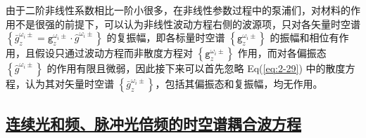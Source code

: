 由于二阶非线性系数相比一阶小很多，在非线性参数过程中的泵浦们，对材料的作用不是很强的前提下，可以认为非线性波动方程右侧的波源项，只对各矢量时空谱 $\left\{ \bar{g}^{\omega_i\pm}_{z} = {\mathtt{g}}^{\omega_i\pm}_{z} \cdot \hat{g}^{\omega_i\pm} \right\}$ 的复振幅，即各标量时空谱 $\left\{ {\mathtt{g}}^{\omega_i\pm}_{z} \right\}$ 的振幅和相位有作用，且假设只通过波动方程而非散度方程对 $\left\{ {\mathtt{g}}^{\omega_i\pm}_{z} \right\}$ 作用，而对各偏振态 $\left\{ \hat{g}^{\omega_i\pm} \right\}$ 的作用有限且微弱，因此接下来可以首先忽略 Eq(\ref{eq:2-29}) 中的散度方程，认为其对矢量时空谱 $\left\{ \bar{g}^{\omega_i\pm}_{z} \right\}$，包括其偏振态和复振幅，均无作用。

\subsection{\protect\hyperlink{chap:\thesubsection}{连续光和频、脉冲光倍频的时空谱耦合波方程}}
\label{连续光和频、脉冲光倍频的时空谱耦合波方程}

